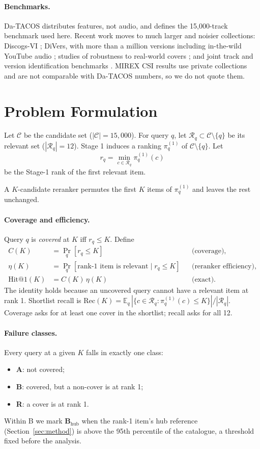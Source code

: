 \documentclass[10pt]{article}
\begin{document}
\paragraph{Benchmarks.}
Da-TACOS \citep{datacos} distributes features, not audio, and defines the 15{,}000-track benchmark used here.
Recent work moves to much larger and noisier collections: Discogs-VI \citep{discogsvi}; DiVers, with more than a million versions including in-the-wild YouTube audio \citep{divers}; studies of robustness to real-world covers \citep{hachmeier2025}; and joint track and version identification benchmarks \citep{araz2026unified}.
MIREX CSI results use private collections and are not comparable with Da-TACOS numbers, so we do not quote them.

\section{Problem Formulation}\label{sec:problem}
Let $\mathcal{C}$ be the candidate set ($|\mathcal{C}|=15{,}000$). For query $q$, let $\mathcal{R}_q\subset\mathcal{C}\setminus\{q\}$ be its relevant set ($|\mathcal{R}_q|=12$). Stage 1 induces a ranking $\pi^{(1)}_q$ of $\mathcal{C}\setminus\{q\}$. Let
\[
r_q=\min_{c\in\mathcal{R}_q}\pi^{(1)}_q(c)
\]
be the Stage-1 rank of the first relevant item.

A $K$-candidate reranker permutes the first $K$ items of $\pi^{(1)}_q$ and leaves the rest unchanged.

\paragraph{Coverage and efficiency.} Query $q$ is \emph{covered} at $K$ iff $r_q\le K$. Define
\begin{align*}
C(K) &= \Pr_q[r_q\le K] &&\text{(coverage)},\\
\eta(K) &= \Pr_q[\text{rank-1 item is relevant}\mid r_q\le K] &&\text{(reranker efficiency)},\\
\mathrm{Hit@1}(K) &= C(K)\,\eta(K) &&\text{(exact).}
\end{align*}
The identity holds because an uncovered query cannot have a relevant item at rank 1.
Shortlist recall is $\mathrm{Rec}(K)=\mathbb{E}_q\,|\{c\in\mathcal{R}_q:\pi^{(1)}_q(c)\le K\}|/|\mathcal{R}_q|$. Coverage asks for at least one cover in the shortlist; recall asks for all 12.

\paragraph{Failure classes.} Every query at a given $K$ falls in exactly one class:
\begin{itemize}
\item \textbf{A}: not covered;
\item \textbf{B}: covered, but a non-cover is at rank 1;
\item \textbf{R}: a cover is at rank 1.
\end{itemize}
Within B we mark \textbf{B}$_\text{hub}$ when the rank-1 item's hub reference (Section~\ref{sec:method}) is above the 95th percentile of the catalogue, a threshold fixed before the analysis.
\end{document}
